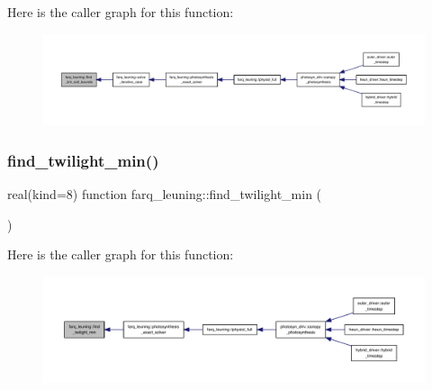 Here is the caller graph for this function\+:
\nopagebreak
\begin{figure}[H]
\begin{center}
\leavevmode
\includegraphics[width=350pt]{namespacefarq__leuning_a7f904e78bc57baa0ad78b38d7455e710_icgraph}
\end{center}
\end{figure}
\mbox{\label{namespacefarq__leuning_a2a73acc8f131feea39acb9830fadc1cc}} 
\subsubsection{\texorpdfstring{find\+\_\+twilight\+\_\+min()}{find\_twilight\_min()}}
{\footnotesize\ttfamily real(kind=8) function farq\+\_\+leuning\+::find\+\_\+twilight\+\_\+min (\begin{DoxyParamCaption}{ }\end{DoxyParamCaption})}

Here is the caller graph for this function\+:
\nopagebreak
\begin{figure}[H]
\begin{center}
\leavevmode
\includegraphics[width=350pt]{namespacefarq__leuning_a2a73acc8f131feea39acb9830fadc1cc_icgraph}
\end{center}
\end{figure}
\mbox{\label{namespacefarq__leuning_a0aaa5d6b54e5a9a9549d2c43bfbecf06}} 
